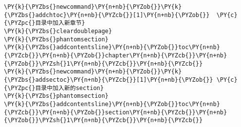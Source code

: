 \begin{Verbatim}[commandchars=\\\{\}]
\PY{k}{\PYZbs{}newcommand}\PY{n+nb}{\PYZob{}}\PY{k}{\PYZbs{}addchtoc}\PY{n+nb}{\PYZcb{}}[1]\PY{n+nb}{\PYZob{}}  \PY{c}{\PYZpc{}目录中加入新章节}
\PY{k}{\PYZbs{}cleardoublepage}
\PY{k}{\PYZbs{}phantomsection}
\PY{k}{\PYZbs{}addcontentsline}\PY{n+nb}{\PYZob{}}toc\PY{n+nb}{\PYZcb{}}\PY{n+nb}{\PYZob{}}chapter\PY{n+nb}{\PYZcb{}}\PY{n+nb}{\PYZob{}}\PYZsh{}1\PY{n+nb}{\PYZcb{}}\PY{n+nb}{\PYZcb{}}
\PY{k}{\PYZbs{}newcommand}\PY{n+nb}{\PYZob{}}\PY{k}{\PYZbs{}addsectoc}\PY{n+nb}{\PYZcb{}}[1]\PY{n+nb}{\PYZob{}} \PY{c}{\PYZpc{}目录中加入新的section}
\PY{k}{\PYZbs{}phantomsection}
\PY{k}{\PYZbs{}addcontentsline}\PY{n+nb}{\PYZob{}}toc\PY{n+nb}{\PYZcb{}}\PY{n+nb}{\PYZob{}}section\PY{n+nb}{\PYZcb{}}\PY{n+nb}{\PYZob{}}\PYZsh{}1\PY{n+nb}{\PYZcb{}}\PY{n+nb}{\PYZcb{}}
\end{Verbatim}
